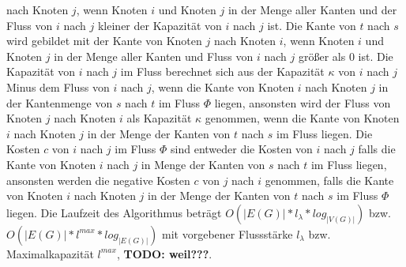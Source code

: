 nach Knoten $j$, wenn Knoten $i$ und Knoten $j$ in der Menge aller Kanten und der 
Fluss von $i$ nach $j$ kleiner der Kapazität von $i$ nach $j$ ist. Die Kante von $t$
nach $s$ wird gebildet mit der Kante von Knoten $j$ nach Knoten $i$, wenn Knoten $i$
und Knoten $j$ in der Menge aller Kanten und Fluss von $i$ nach $j$ größer als 0 ist.
Die Kapazität von $i$ nach $j$ im Fluss berechnet sich aus der Kapazität $\kappa$
von $i$ nach $j$ Minus dem Fluss von $i$ nach $j$, wenn die Kante von Knoten $i$ nach
Knoten $j$ in der Kantenmenge von $s$ nach $t$ im Fluss $\Phi$ liegen, ansonsten wird
der Fluss von Knoten $j$ nach Knoten $i$ als Kapazität $\kappa$ genommen, wenn die 
Kante von Knoten $i$ nach Knoten $j$ in der Menge der Kanten von $t$ nach $s$ im 
Fluss liegen. Die Kosten $c$ von $i$ nach $j$ im Fluss $\Phi$ sind entweder die
Kosten von $i$ nach $j$ falls die Kante von Knoten $i$ nach $j$ in Menge der Kanten
von $s$ nach $t$ im Fluss liegen, ansonsten werden die negative Kosten $c$ von $j$ 
nach $i$ genommen, falls die Kante von Knoten $i$ nach Knoten $j$ in der Menge der
Kanten von $t$ nach $s$ im Fluss $\Phi$ liegen. Die Laufzeit des Algorithmus beträgt
$O(|E(G)| * l_\lambda * log_{|V(G)|})$ bzw. $O(|E(G)| * l^{max} * log_{|E(G)|})$ 
mit vorgebener Flussstärke $l_\lambda$ bzw. Maximalkapazität $l^{max}$,
\textbf{TODO: weil???}. \cite{kripfganz, optiv, tudortmund, bellford}